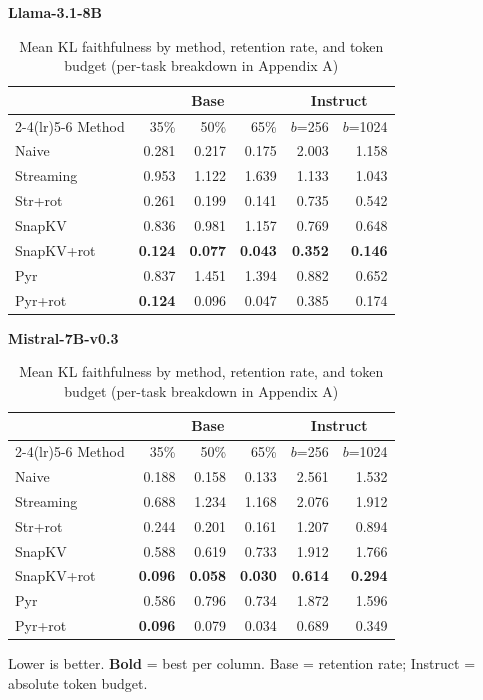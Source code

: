\documentclass[10pt,letterpaper]{article}
\begin{document}
\begin{table}[H]
\centering
\small
\captionsetup{justification=centering}
\caption{Mean KL faithfulness by method, retention rate, and token budget (per-task breakdown in Appendix A)}
\label{tab:t3}
\begin{minipage}[t]{0.49\textwidth}
\centering
\textbf{Llama-3.1-8B}\\[0.4em]
\begin{tabular}{@{}lrrrrr@{}}
\toprule
& \multicolumn{3}{c}{Base} & \multicolumn{2}{c}{Instruct}\\
\cmidrule(lr){2-4}\cmidrule(lr){5-6}
Method & 35\% & 50\% & 65\% & $b$=256 & $b$=1024\\
\midrule
Naive      & 0.281 & 0.217 & 0.175 & 2.003 & 1.158\\
Streaming  & 0.953 & 1.122 & 1.639 & 1.133 & 1.043\\
Str+rot    & 0.261 & 0.199 & 0.141 & 0.735 & 0.542\\
SnapKV     & 0.836 & 0.981 & 1.157 & 0.769 & 0.648\\
SnapKV+rot & \textbf{0.124} & \textbf{0.077} & \textbf{0.043} & \textbf{0.352} & \textbf{0.146}\\
Pyr        & 0.837 & 1.451 & 1.394 & 0.882 & 0.652\\
Pyr+rot    & \textbf{0.124} & 0.096 & 0.047 & 0.385 & 0.174\\
\bottomrule
\end{tabular}
\end{minipage}%
\hfill
\begin{minipage}[t]{0.49\textwidth}
\centering
\textbf{Mistral-7B-v0.3}\\[0.4em]
\begin{tabular}{@{}lrrrrr@{}}
\toprule
& \multicolumn{3}{c}{Base} & \multicolumn{2}{c}{Instruct}\\
\cmidrule(lr){2-4}\cmidrule(lr){5-6}
Method & 35\% & 50\% & 65\% & $b$=256 & $b$=1024\\
\midrule
Naive      & 0.188 & 0.158 & 0.133 & 2.561 & 1.532\\
Streaming  & 0.688 & 1.234 & 1.168 & 2.076 & 1.912\\
Str+rot    & 0.244 & 0.201 & 0.161 & 1.207 & 0.894\\
SnapKV     & 0.588 & 0.619 & 0.733 & 1.912 & 1.766\\
SnapKV+rot & \textbf{0.096} & \textbf{0.058} & \textbf{0.030} & \textbf{0.614} & \textbf{0.294}\\
Pyr        & 0.586 & 0.796 & 0.734 & 1.872 & 1.596\\
Pyr+rot    & \textbf{0.096} & 0.079 & 0.034 & 0.689 & 0.349\\
\bottomrule
\end{tabular}
\end{minipage}
\par\smallskip
Lower is better. \textbf{Bold} = best per column. Base = retention rate; Instruct = absolute token budget.
\end{table}
\end{document}
